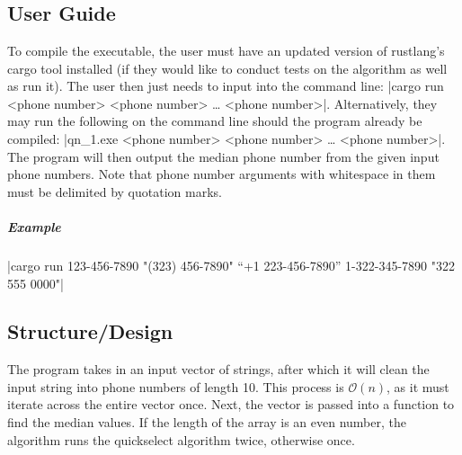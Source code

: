 \documentclass{report}
\begin{document}
\chapter{}
\section{User Guide}
To compile the executable, the user must have an updated version of rustlang's cargo tool installed (if they would like to conduct tests on the algorithm as well as run it). The user then just needs to input into the command line: |cargo run <phone number> <phone number> … <phone number>|. Alternatively, they may run the following on the command line should the program already be compiled: |qn_1.exe <phone number> <phone number> … <phone number>|. The program will then output the median phone number from the given input phone numbers. Note that phone number arguments with whitespace in them must be delimited by quotation marks.
\paragraph{Example} |cargo run 123-456-7890 "(323) 456-7890" “+1 223-456-7890” 1-322-345-7890 "322 555 0000"|

\section{Structure/Design}
The program takes in an input vector of strings, after which it will clean the input string into phone numbers of length 10. This process is \(\mathcal{O}(n)\), as it must iterate across the entire vector once. Next, the vector is passed into a function to find the median values. If the length of the array is an even number, the algorithm runs the quickselect algorithm twice, otherwise once.
\end{document}
